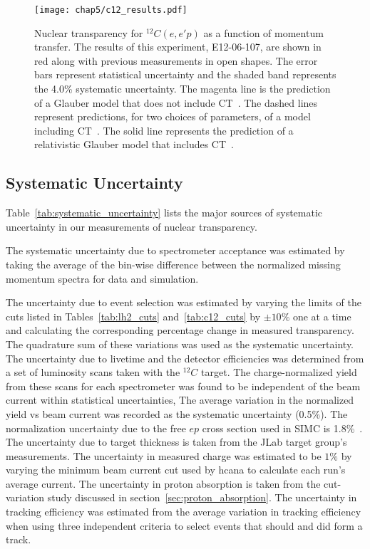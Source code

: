 \begin{figure}[!h]
    \centering
    \texttt{[image: chap5/c12\_results.pdf]}
    \caption[Nuclear transparency for ${}^{12}C(e,e'p)$ as a function of momentum transfer.]{
            Nuclear transparency for ${}^{12}C(e,e'p)$ as a function of
            momentum transfer.
            The results of this experiment, E12-06-107, are shown in red along
            with previous measurements in open shapes.
            The error bars represent statistical uncertainty and the
            shaded band represents the 4.0\% systematic uncertainty.
            The magenta line is the prediction of a Glauber
            model that does not include CT~\cite{Pandharipande_1992}.
            The dashed lines represent predictions, for two choices of
            parameters, of a model including CT~\cite{Frankfurt_1995_PRC}.
            The solid line represents the prediction of a relativistic Glauber
            model that includes CT~\cite{Cosyn_2006}.
            }
    \label{fig:c12_transparency_results}
\end{figure}

\subsection{Systematic Uncertainty}

Table~\ref{tab:systematic_uncertainty} lists the major sources of systematic
uncertainty in our measurements of nuclear transparency.


The systematic uncertainty due to spectrometer acceptance was estimated by
taking the average of the bin-wise difference between the normalized missing
momentum spectra for data and simulation.


The uncertainty due to event selection was estimated by varying the limits of
the cuts listed in Tables~\ref{tab:lh2_cuts} and~\ref{tab:c12_cuts}
by $\pm10\%$ one at a time
and calculating the corresponding percentage change in measured transparency.
The quadrature sum of these variations was used as the systematic uncertainty.
The uncertainty due to livetime and the detector efficiencies was determined
from a set of luminosity scans taken with the ${}^{12}C$ target.
The charge-normalized yield from these scans for each spectrometer was found to
be independent of the beam current within statistical uncertainties,
The average variation in the normalized yield vs beam current was recorded as the
systematic uncertainty (0.5\%).
The normalization uncertainty due to the free $ep$ cross section used in
SIMC is 1.8\%~\cite{Bosted_1995}.
The uncertainty due to target thickness is taken from the JLab target group's
measurements. %
The uncertainty in measured charge was estimated to be $1\%$ by varying the
minimum beam current cut used by hcana to calculate each run's average
current.
The uncertainty in proton absorption is taken from the cut-variation study
discussed in section~\ref{sec:proton_absorption}.
The uncertainty in tracking efficiency was estimated from the average variation
in tracking efficiency when using three independent criteria to select events
that should and did form a track.

